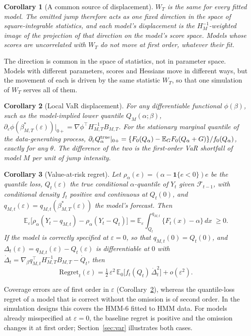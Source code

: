 \documentclass[11pt,a4paper]{article}
\newtheorem{corollary}{Corollary}
\theoremstyle{definition}
\theoremstyle{remark}
\newcommand{\E}{\mathbb{E}}
\newcommand{\F}{\mathcal{F}}
\newcommand{\tr}{^{\top}}
\begin{document}
\begin{corollary}[A common source of displacement]\label{cor:common}
$W_T$ is the same for every fitted model. The omitted jump therefore acts as one fixed direction in the space of square-integrable statistics, and each model's displacement is the $H_M^{-1}$-weighted image of the projection of that direction on the model's score space. Models whose scores are uncorrelated with $W_T$ do not move at first order, whatever their fit.
\end{corollary}
\noindent The direction is common in the space of statistics, not in parameter space. Models with different parameters, scores and Hessians move in different ways, but the movement of each is driven by the same statistic $W_T$, so that one simulation of $W_T$ serves all of them.

\begin{corollary}[Local VaR displacement]\label{cor:var}
For any differentiable functional $\phi(\beta)$, such as the model-implied lower quantile $Q_M(\alpha;\beta)$, $\partial_\varepsilon\phi(\beta^*_{M,T}(\varepsilon))|_{0+}=\nabla\phi\tr H_{M,T}^{-1}B_{M,T}$. For the stationary marginal quantile of the data-generating process, $\partial_\varepsilon Q^{\rm true}_\alpha|_{0+}=\{F_0(Q_\alpha)-\E_GF_0(Q_\alpha+G)\}/f_0(Q_\alpha)$, exactly for any $\theta$. The difference of the two is the first-order VaR shortfall of model $M$ per unit of jump intensity.
\end{corollary}


\begin{corollary}[Value-at-risk regret]\label{cor:regret}
Let $\rho_\alpha(e)=(\alpha-\mathbf 1\{e<0\})e$ be the quantile loss, $Q_t(\varepsilon)$ the true conditional $\alpha$-quantile of $Y_t$ given $\F_{t-1}$, with conditional density $f_t$ positive and continuous at $Q_t(0)$, and $q_{M,t}(\varepsilon)=q_{M,t}(\beta^*_{M,T}(\varepsilon))$ the model's forecast. Then
\[
\E_\varepsilon\big[\rho_\alpha(Y_t-q_{M,t})-\rho_\alpha(Y_t-Q_t)\big]=\E_\varepsilon\int_{Q_t}^{q_{M,t}}\big\{F_t(x)-\alpha\big\}\,dx\;\ge0 .
\]
If the model is correctly specified at $\varepsilon=0$, so that $q_{M,t}(0)=Q_t(0)$, and $\Delta_t(\varepsilon)=q_{M,t}(\varepsilon)-Q_t(\varepsilon)$ is differentiable at $0$ with $\dot\Delta_t=\nabla_\beta q_{M,t}\tr H_{M,T}^{-1}B_{M,T}-\dot Q_t$, then
\[
\text{Regret}_t(\varepsilon)=\tfrac12\,\varepsilon^2\,\E_0\big[f_t(Q_t)\,\dot\Delta_t^2\big]+o(\varepsilon^2).
\]
\end{corollary}

\noindent Coverage errors are of first order in $\varepsilon$ (Corollary~\ref{cor:var}), whereas the quantile-loss regret of a model that is correct without the omission is of second order. In the simulation designs this covers the HMM-6 fitted to HMM data. For models already misspecified at $\varepsilon=0$, the baseline regret is positive and the omission changes it at first order; Section~\ref{sec:var} illustrates both cases.
\end{document}
